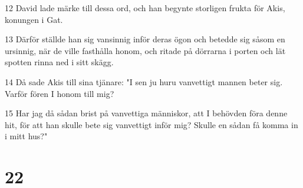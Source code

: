 \par 12 David lade märke till dessa ord, och han begynte storligen frukta för Akis, konungen i Gat.
\par 13 Därför ställde han sig vansinnig inför deras ögon och betedde sig såsom en ursinnig, när de ville fasthålla honom, och ritade på dörrarna i porten och lät spotten rinna ned i sitt skägg.
\par 14 Då sade Akis till sina tjänare: "I sen ju huru vanvettigt mannen beter sig. Varför fören I honom till mig?
\par 15 Har jag då sådan brist på vanvettiga människor, att I behövden föra denne hit, för att han skulle bete sig vanvettigt inför mig? Skulle en sådan få komma in i mitt hus?"

\chapter{22}


